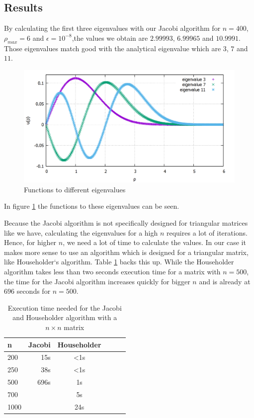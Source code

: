 \documentclass[10pt,a4paper]{article}
\begin{document}
\subsection{Results}\label{Results}

By calculating the first three eigenvalues with our Jacobi algorithm for $n = 400$, $\rho_{max} = 6$ and $\epsilon = 10^{-8}$,the values we obtain are $2.99993$, $6.99965$ and $10.9991$. Those eigenvalues match good with the analytical eigenvalue which are $3$, $7$ and $11$.

\begin{figure}[h]
	\includegraphics[scale = 0.25]{tvJacobi_comparison_thick.png}
	\centering
	\caption{Functions to different eigenvalues}
	\label{plot1el}
\end{figure}

In figure \ref{plot1el} the functions to these eigenvalues can be seen.

Because the Jacobi algorithm is not specifically designed for triangular matrices like we have, calculating the eigenvalues for a high $n$ requires a lot of iterations. Hence, for higher $n$, we need a lot of time to calculate the values. In our case it makes more sense to use an algorithm which is designed for a triangular matrix, like Householder`s algorithm. Table \ref{executiontime} backs this up. While the Householder algorithm takes less than two seconds execution time for a matrix with $n = 500$, the time for the Jacobi algorithm increases quickly for bigger $n$ and is already at $696$ seconds for $n = 500$.

\begin{table}[h!]
	\centering
	\begin{tabular}{|l|r|c|lrp{16cm}}\hline
		n & Jacobi & Householder\\\hline
		200 & 15s & <1s\\
		250 & 38s & <1s\\
		500 & 696s & 1s\\
		700 & & 5s \\
		1000 & & 24s\\\hline
	\end{tabular}
	\caption{Execution time needed for the Jacobi and Householder algorithm with a $n\times n$ matrix }
	\label{executiontime}
\end{table}
\end{document}
